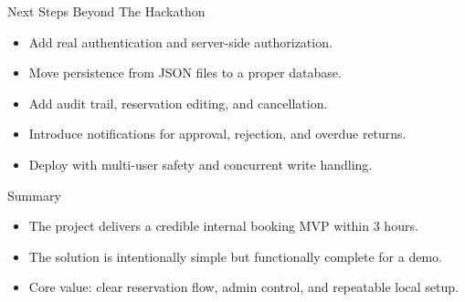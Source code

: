 \documentclass[aspectratio=169]{beamer}
\begin{document}
\begin{frame}{Next Steps Beyond The Hackathon}
  \begin{itemize}
    \item Add real authentication and server-side authorization.
    \item Move persistence from JSON files to a proper database.
    \item Add audit trail, reservation editing, and cancellation.
    \item Introduce notifications for approval, rejection, and overdue returns.
    \item Deploy with multi-user safety and concurrent write handling.
  \end{itemize}
\end{frame}

\begin{frame}{Summary}
  \begin{itemize}
    \item The project delivers a credible internal booking MVP within 3 hours.
    \item The solution is intentionally simple but functionally complete for a demo.
    \item Core value: clear reservation flow, admin control, and repeatable local setup.
  \end{itemize}
\end{frame}
\end{document}
